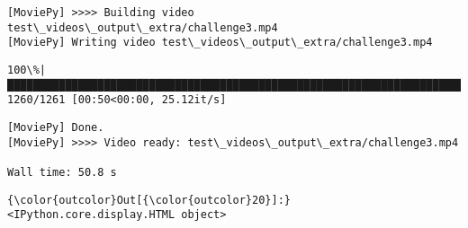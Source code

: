 \documentclass[11pt]{article}
\begin{document}
    \begin{Verbatim}[commandchars=\\\{\}]
[MoviePy] >>>> Building video test\_videos\_output\_extra/challenge3.mp4
[MoviePy] Writing video test\_videos\_output\_extra/challenge3.mp4

    \end{Verbatim}

    \begin{Verbatim}[commandchars=\\\{\}]
100\%|█████████████████████████████████████████████████████████████████████████████▉| 1260/1261 [00:50<00:00, 25.12it/s]

    \end{Verbatim}

    \begin{Verbatim}[commandchars=\\\{\}]
[MoviePy] Done.
[MoviePy] >>>> Video ready: test\_videos\_output\_extra/challenge3.mp4 

Wall time: 50.8 s

    \end{Verbatim}

\begin{Verbatim}[commandchars=\\\{\}]
{\color{outcolor}Out[{\color{outcolor}20}]:} <IPython.core.display.HTML object>
\end{Verbatim}
            

    
    
    
    
\end{document}
